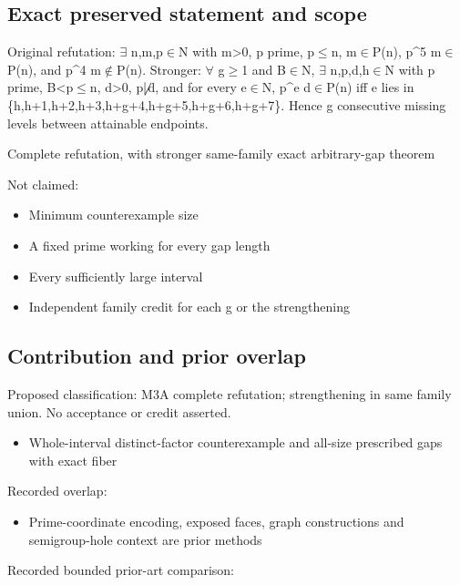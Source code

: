 \documentclass[11pt,a4paper]{article}
\begin{document}
\subsection{Exact preserved statement and scope}
Original refutation: \ensuremath{\exists} n,m,p\ensuremath{\in}N with m>0, p prime, p\ensuremath{\leq}n, m\ensuremath{\in}P(n), p\textasciicircum{}5 m\ensuremath{\in}P(n), and p\textasciicircum{}4 m\ensuremath{\notin}P(n). Stronger: \ensuremath{\forall} g\ensuremath{\geq}1 and B\ensuremath{\in}N, \ensuremath{\exists} n,p,d,h\ensuremath{\in}N with p prime, B<p\ensuremath{\leq}n, d>0, p\ensuremath{\not\mid}d, and for every e\ensuremath{\in}N, p\textasciicircum{}e d\ensuremath{\in}P(n) iff e lies in \{h,h+1,h+2,h+3,h+g+4,h+g+5,h+g+6,h+g+7\}. Hence g consecutive missing levels between attainable endpoints.

Complete refutation, with stronger same-family exact arbitrary-gap theorem

Not claimed:

\begin{itemize}
\item Minimum counterexample size
\end{itemize}
\begin{itemize}
\item A fixed prime working for every gap length
\end{itemize}
\begin{itemize}
\item Every sufficiently large interval
\end{itemize}
\begin{itemize}
\item Independent family credit for each g or the strengthening
\end{itemize}
\subsection{Contribution and prior overlap}
Proposed classification: M3A complete refutation; strengthening in same family union. No acceptance or credit asserted.

\begin{itemize}
\item Whole-interval distinct-factor counterexample and all-size prescribed gaps with exact fiber
\end{itemize}
Recorded overlap:

\begin{itemize}
\item Prime-coordinate encoding, exposed faces, graph constructions and semigroup-hole context are prior methods
\end{itemize}
Recorded bounded prior-art comparison:
\end{document}
